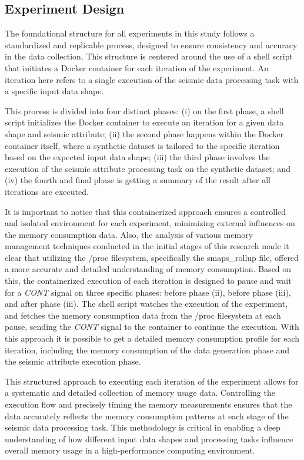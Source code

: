 \subsection{Experiment Design}
\label{subsec:experiment-design}

The foundational structure for all experiments in this study follows a standardized and replicable process, designed to ensure consistency and accuracy in the data collection.
This structure is centered around the use of a shell script that initiates a Docker container for each iteration of the experiment.
An iteration here refers to a single execution of the seismic data processing task with a specific input data shape.

This process is divided into four distinct phases:
(i) on the first phase, a shell script initializes the Docker container to execute an iteration for a given data shape and seismic attribute;
(ii) the second phase happens within the Docker container itself, where a synthetic dataset is tailored to the specific iteration based on the expected input data shape;
(iii) the third phase involves the execution of the seismic attribute processing task on the synthetic dataset; and
(iv) the fourth and final phase is getting a summary of the result after all iterations are executed.

It is important to notice that this containerized approach ensures a controlled and isolated environment for each experiment, minimizing external influences on the memory consumption data.
Also, the analysis of various memory management techniques conducted in the initial stages of this research made it clear that utilizing the /proc filesystem, specifically the smaps\_rollup file, offered a more accurate and detailed understanding of memory consumption.
Based on this, the containerized execution of each iteration is designed to pause and wait for a \textit{CONT} signal on three specific phases: before phase (ii), before phase (iii), and after phase (iii).
The shell script watches the execution of the experiment, and fetches the memory consumption data from the /proc filesystem at each pause, sending the \textit{CONT} signal to the container to continue the execution.
With this approach it is possible to get a detailed memory consumption profile for each iteration, including the memory consumption of the data generation phase and the seismic attribute execution phase.

This structured approach to executing each iteration of the experiment allows for a systematic and detailed collection of memory usage data.
Controlling the execution flow and precisely timing the memory measurements ensures that the data accurately reflects the memory consumption patterns at each stage of the seismic data processing task.
This methodology is critical in enabling a deep understanding of how different input data shapes and processing tasks influence overall memory usage in a high-performance computing environment.